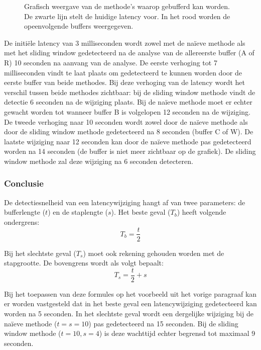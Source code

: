\begin{figure}[h!]
	\captionsetup{width=0.7\textwidth}
	\caption[Voorbeeld buffering methodes]{Grafisch weergave van de methode's waarop gebufferd kan worden. De zwarte lijn stelt de huidige latency voor. In het rood worden de opeenvolgende buffers weergegeven.}
	\begin{center}
		\advance\parskip0.3cm
		
	\end{center}
	\label{latency}
\end{figure}

De initiële latency van 3 milliseconden wordt zowel met de naïeve methode als met het sliding window gedetecteerd na de analyse van de allereerste buffer (A of R) 10 seconden na aanvang van de analyse. De eerste verhoging tot 7 milliseconden vindt te laat plaats om gedetecteerd te kunnen worden door de eerste buffer van beide methodes. Bij deze verhoging van de latency wordt het verschil tussen beide methodes zichtbaar: bij  de sliding window methode vindt de detectie 6 seconden na de wijziging plaats. Bij de naïeve methode moet er echter gewacht worden tot wanneer buffer B is volgelopen 12 seconden na de wijziging. De tweede verhoging naar 10 seconden wordt zowel door de naïeve methode als door de sliding window methode gedetecteerd na 8 seconden (buffer C of W). De laatste wijziging naar 12 seconden kan door de naïeve methode pas gedetecteerd worden na 14 seconden (de buffer is niet meer zichtbaar op de grafiek). De sliding window methode zal deze wijziging na 6 seconden detecteren.

\subsubsection{Conclusie}

De detectiesnelheid van een latencywijziging hangt af van twee parameters: de bufferlengte ($t$) en de staplengte ($s$). Het beste geval ($ T_b $) heeft volgende ondergrens:
\begin{equation}
T_b = \frac{t}{2}
\end{equation}

Bij het slechtste geval ($ T_s $) moet ook rekening gehouden worden met de stapgrootte. De bovengrens wordt als volgt bepaalt:
\begin{equation}
T_s = \frac{t}{2} + s
\end{equation}

Bij het toepassen van deze formules op het voorbeeld uit het vorige paragraaf kan er worden vastgesteld dat in het beste geval een latencywijziging gedetecteerd kan worden na 5 seconden. In het slechtste geval wordt een dergelijke wijziging bij de naïeve methode ($t = s = 10 $) pas gedetecteerd na 15 seconden. Bij de sliding window methode ($t = 10, s = 4 $) is deze wachttijd echter begrensd tot maximaal 9 seconden.

